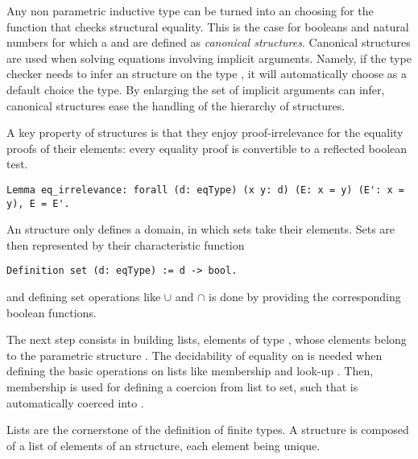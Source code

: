 Any non parametric inductive type can be turned
into an  choosing for \C{==} the function that
checks structural equality.
This is the case for booleans and natural numbers for which a  
and  are defined as {\it canonical structures}. Canonical
structures are used when solving equations involving 
implicit arguments. Namely, if the type
checker needs to infer an  structure on the type
, it will automatically choose as a default choice the 
type. By enlarging the set of implicit arguments \Coq{}
can infer, canonical structures ease the handling of the
hierarchy of structures.

A key property of  structures is that
they enjoy proof-irrelevance for the
equality proofs of their elements: every equality proof is
convertible to a reflected boolean test.

\begin{lstlisting}
Lemma eq_irrelevance: forall (d: eqType) (x y: d) (E: x = y) (E': x = y), E = E'.
\end{lstlisting}

%
%

An  structure only defines a domain, in which sets take their elements. Sets are 
then represented by their characteristic function 
\begin{lstlisting}
Definition set (d: eqType) := d -> bool.
\end{lstlisting}
and defining set operations like $\cup$ and $\cap$
is done by providing the corresponding boolean functions.

The next step consists in building lists, elements of type , 
whose elements belong to the parametric  structure . The decidability of equality
on  is needed when defining the basic operations on
lists like membership \C{\\in} and look-up . Then, membership
is used for defining a coercion from list to set, such
that  is automatically coerced into .

Lists are the cornerstone of the definition of finite types. 
A  structure is composed of a list of
elements of an  structure, each element being unique.

